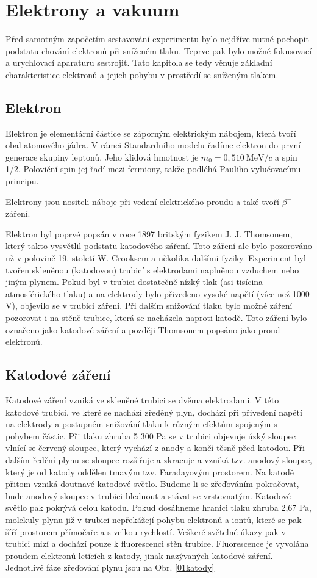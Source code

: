 \newpage
\chapter{Elektrony a vakuum}
Před samotným započetím sestavování experimentu bylo nejdříve nutné pochopit podstatu chování elektronů při sníženém tlaku. Teprve pak bylo možné fokusovací a urychlovací aparaturu sestrojit. Tato kapitola se tedy věnuje základní charakteristice elektronů a jejich pohybu v prostředí se sníženým tlakem.

\section{Elektron}
Elektron je elementární částice se záporným elektrickým nábojem, která tvoří obal atomového jádra. V rámci Standardního modelu řadíme elektron do první generace skupiny leptonů. Jeho klidová hmotnost je $m_{0}=0,510~\mathrm{MeV}/c$ \cite{01Elektron} a spin 1/2. Poloviční spin jej řadí mezi fermiony, takže podléhá Pauliho vylučovacímu principu.

Elektrony jsou nositeli náboje při vedení elektrického proudu a také tvoří $\beta^{-}$ záření.

Elektron byl poprvé popsán v roce 1897 britským fyzikem J. J. Thomsonem, který takto vysvětlil podstatu katodového záření. Toto záření ale bylo pozorováno už v polovině 19. století W. Crooksem a několika dalšími fyziky. Experiment byl tvořen skleněnou (katodovou) trubicí s elektrodami naplněnou vzduchem nebo jiným plynem. Pokud byl v trubici dostatečně nízký tlak (asi tisícina atmosférického tlaku) a na elektrody bylo přivedeno vysoké napětí (více než 1000 V), objevilo se v trubici záření. Při dalším snižování tlaku bylo možné záření pozorovat i na stěně trubice, která se nacházela naproti katodě. Toto záření bylo označeno jako katodové záření a později Thomsonem popsáno jako proud elektronů.

\section{Katodové záření}
Katodové záření vzniká ve skleněné trubici se dvěma elektrodami. V této katodové trubici, ve které se nachází zředěný plyn, dochází při přivedení napětí na elektrody a postupném snižování tlaku k různým efektům spojeným s pohybem částic. Při tlaku zhruba 5 300 Pa se v trubici objevuje úzký sloupec vlnící se červený sloupec, který vychází z anody a končí těsně před katodou. Při dalším ředění plynu se sloupec rozšiřuje a zkracuje a vzniká tzv. anodový sloupec, který je od katody oddělen tmavým tzv. Faradayovým prostorem. Na katodě přitom vzniká doutnavé katodové světlo. Budeme-li se zřeďováním pokračovat, bude anodový sloupec v trubici blednout a stávat se vrstevnatým. Katodové světlo pak pokrývá celou katodu. Pokud dosáhneme hranici tlaku zhruba 2,67 Pa, molekuly plynu již v trubici nepřekážejí pohybu elektronů a iontů, které se pak šíří prostorem přímočaře a s velkou rychlostí. Veškeré světelné úkazy pak v trubici mizí a dochází pouze k fluorescenci stěn trubice. Fluorescence je vyvolána proudem elektronů letících z katody, jinak nazývaných katodové záření. Jednotlivé fáze zřeďování plynu jsou na Obr. \ref{01katody}

